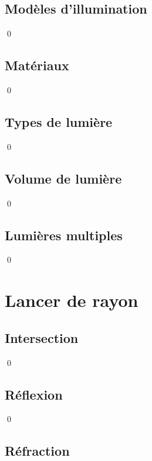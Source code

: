 \documentclass[12pt]{article}
\newcommand{\state}{\noindent}
\begin{document}
\subsection{Modèles d'illumination}

\state

\qed

\subsection{Matériaux}

\state

\qed

\subsection{Types de lumière}

\state

\qed

\subsection{Volume de lumière}

\state

\qed

\subsection{Lumières multiples}

\state

\qed

\pagebreak

\section{Lancer de rayon}

\subsection{Intersection}

\state

\qed

\subsection{Réflexion}

\state

\qed

\subsection{Réfraction}
\end{document}
